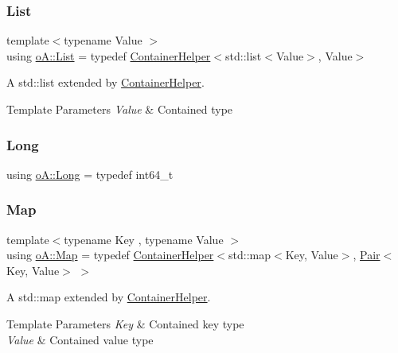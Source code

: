 \subsubsection{\texorpdfstring{List}{List}}
{\footnotesize\ttfamily template$<$typename Value $>$ \\
using \mbox{\hyperlink{namespaceo_a_a32faab7cf59b3e127611687f2b55b72e}{o\+A\+::\+List}} = typedef \mbox{\hyperlink{classo_a_1_1_container_helper}{Container\+Helper}}$<$std\+::list$<$Value$>$, Value$>$}



A std\+::list extended by \mbox{\hyperlink{classo_a_1_1_container_helper}{Container\+Helper}}. 


\begin{DoxyTemplParams}{Template Parameters}
{\em Value} & Contained type \\
\hline
\end{DoxyTemplParams}
\mbox{\label{namespaceo_a_ab34d92c907da3ac86211277a1341c6c2}} 
\subsubsection{\texorpdfstring{Long}{Long}}
{\footnotesize\ttfamily using \mbox{\hyperlink{namespaceo_a_ab34d92c907da3ac86211277a1341c6c2}{o\+A\+::\+Long}} = typedef int64\+\_\+t}

\mbox{\label{namespaceo_a_a90c973ca401158a4b6c0c71a2d86d933}} 
\subsubsection{\texorpdfstring{Map}{Map}}
{\footnotesize\ttfamily template$<$typename Key , typename Value $>$ \\
using \mbox{\hyperlink{namespaceo_a_a90c973ca401158a4b6c0c71a2d86d933}{o\+A\+::\+Map}} = typedef \mbox{\hyperlink{classo_a_1_1_container_helper}{Container\+Helper}}$<$std\+::map$<$Key, Value$>$, \mbox{\hyperlink{namespaceo_a_a2e4add9f777dcae3f5afde9e90c75b66}{Pair}}$<$Key, Value$>$ $>$}



A std\+::map extended by \mbox{\hyperlink{classo_a_1_1_container_helper}{Container\+Helper}}. 


\begin{DoxyTemplParams}{Template Parameters}
{\em Key} & Contained key type \\
\hline
{\em Value} & Contained value type \\
\hline
\end{DoxyTemplParams}
\mbox{\label{namespaceo_a_adc2c4dfe90e78df47ae2e677a4d0f9fa}} 
